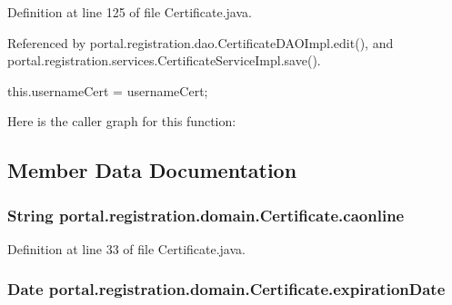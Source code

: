 Definition at line 125 of file Certificate.java.



Referenced by portal.registration.dao.CertificateDAOImpl.edit(), and portal.registration.services.CertificateServiceImpl.save().


\begin{DoxyCode}
                                                         {
                this.usernameCert = usernameCert;
        }
\end{DoxyCode}


Here is the caller graph for this function:




\subsection{Member Data Documentation}
\hypertarget{classportal_1_1registration_1_1domain_1_1Certificate_ad1d84a6be3973282fb57b0aee10a61e2}{
\subsubsection[{caonline}]{\setlength{\rightskip}{0pt plus 5cm}String {\bf portal.registration.domain.Certificate.caonline}}}
\label{classportal_1_1registration_1_1domain_1_1Certificate_ad1d84a6be3973282fb57b0aee10a61e2}


Definition at line 33 of file Certificate.java.

\hypertarget{classportal_1_1registration_1_1domain_1_1Certificate_a059decff874c0a7667aee9122d9e7815}{
\subsubsection[{expirationDate}]{\setlength{\rightskip}{0pt plus 5cm}Date {\bf portal.registration.domain.Certificate.expirationDate}}}
\label{classportal_1_1registration_1_1domain_1_1Certificate_a059decff874c0a7667aee9122d9e7815}



